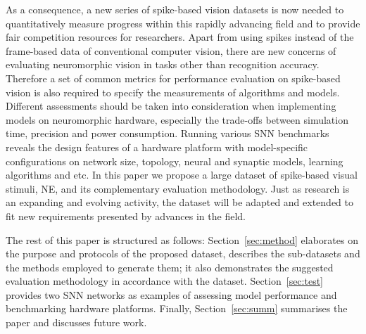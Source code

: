 \documentclass{frontiersENG} %
\begin{document}
As a consequence, a new series of spike-based vision datasets is now needed to quantitatively measure progress within this rapidly advancing field and to provide fair competition resources for researchers.
Apart from using spikes instead of the frame-based data of conventional computer vision, there are new concerns of evaluating neuromorphic vision in tasks other than recognition accuracy.
Therefore a set of common metrics for performance evaluation on spike-based vision is also required to specify the measurements of algorithms and models. 
Different assessments should be taken into consideration when implementing models on neuromorphic hardware, especially the trade-offs between simulation time, precision and power consumption.
Running various SNN benchmarks reveals the design features of a hardware platform with model-specific configurations on network size, topology, neural and synaptic models, learning algorithms and etc.
In this paper we propose a large dataset of spike-based visual stimuli, NE, and its complementary evaluation methodology.
Just as research is an expanding and evolving activity, the dataset will be adapted and extended to fit new requirements presented by advances in the field.

The rest of this paper is structured as follows: Section~\ref{sec:method} elaborates on the purpose and protocols of the proposed dataset, describes the sub-datasets and the methods employed to generate them; it also demonstrates the suggested evaluation methodology in accordance with the dataset.
Section~\ref{sec:test} provides two SNN networks as examples of assessing model performance and benchmarking hardware platforms.
Finally, Section~\ref{sec:summ} summarises the paper and discusses future work.
\end{document}
